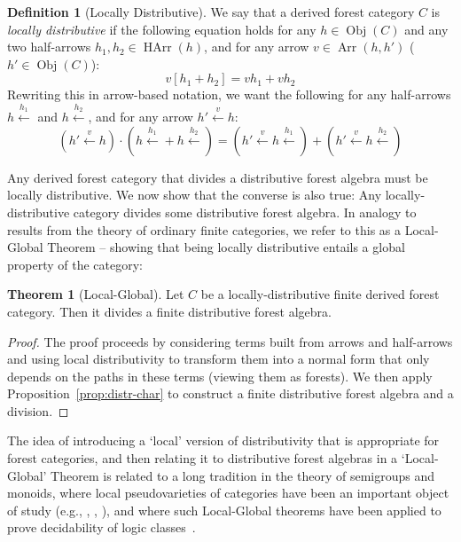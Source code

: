 \documentclass[sigplan,9pt]{acmart}\settopmatter{printfolios=true,printccs=false,printacmref=false}
\newcounter{thm}
\newcounter{theorem}
\theoremstyle{definition}
\newtheorem{defin}[thm]{Definition}
\newtheorem{theorem}[thm]{Theorem}
\newcommand{\carrow}[3]{#3 \xleftarrow{#2} #1 }
\newcommand{\HArr}[0]{{\operatorname{HArr}}}
\newcommand{\Arr}[0]{{\operatorname{Arr}}}
\newcommand{\Obj}[0]{{\operatorname{Obj}}}
\begin{document}
\begin{defin}[Locally Distributive]\label{def:loc-dist}
We say that a derived forest category $C$ is \emph{locally distributive} if the following equation holds
for any $h \in \Obj(C)$ and any two half-arrows $h_1, h_2 \in \HArr(h)$, and for any arrow $v \in \Arr(h,h')$ ($h' \in \Obj(C)$):
$$v [h_1 + h_2] = v h_1 + v h_2$$
Rewriting this in arrow-based notation, we want the following for any half-arrows $\carrow{}{h_1}h$ and $\carrow{}{h_2}h$, and for any arrow $\carrow{h}{v}{h'}$:
$$\left(\carrow{h}{v}{h'}\right)\cdot\left(\carrow{}{h_1}h + \carrow{}{h_2}h\right) = \left(\carrow{\carrow{}{h_1}{h}}{v}{h'}\right) + \left(\carrow{\carrow{}{h_2}{h}}{v}{h'}\right)$$
\end{defin}

Any derived forest category that divides a distributive forest algebra must be locally distributive.
We now show that the converse is also true: Any locally-distributive category divides some distributive forest algebra.
In analogy to results from the theory of ordinary finite categories, we refer to this as a Local-Global Theorem -- showing that being locally distributive entails a global property of the category:

\begin{theorem}[Local-Global]\label{thm:loc-glob}
Let $C$ be a locally-distributive finite derived forest category.
Then it divides a finite distributive forest algebra.
\end{theorem}



\begin{proof}
The proof proceeds by considering terms built from arrows and half-arrows and using local distributivity to transform them into a normal form that only depends on the paths in these terms (viewing them as forests). %
We then apply Proposition~\ref{prop:distr-char} to construct a finite distributive forest algebra and a division.
\end{proof}







The idea of introducing a `local' version of distributivity that is appropriate for forest categories, and then relating it to distributive forest algebras in a `Local-Global' Theorem is related to a long tradition in the theory of semigroups and monoids, where local pseudovarieties of categories have been an important object of study (e.g., \cite{tilson-categories-1987}, \cite{pin-locally-1988}, \cite{almeida-syntactical-1996}), and where such Local-Global theorems have been applied to prove decidability of logic classes~\cite{krebs-effective-2012}.
\end{document}
